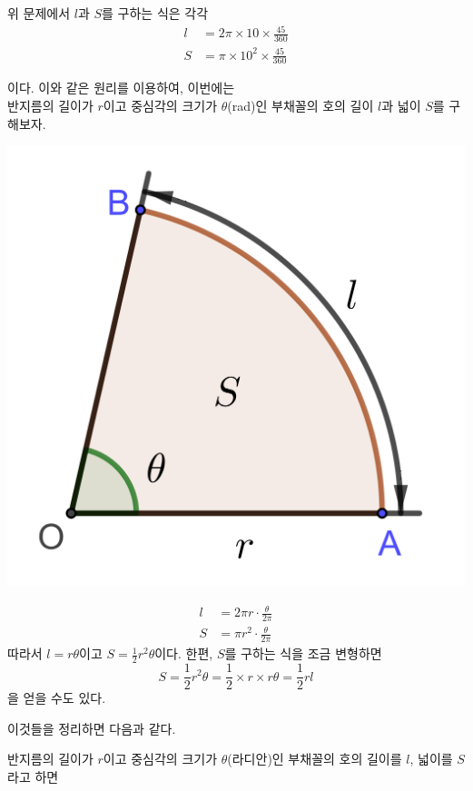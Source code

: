 \documentclass{oblivoir}
\begin{document}
%
\rema{}\label{arc2}
위 문제에서 \(l\)과 \(S\)를 구하는 식은 각각
\begin{align*}
l&=2\pi\times10\times\frac{45}{360}\\
S&=\pi\times10^2\times\frac{45}{360}
\end{align*}
\noindent
\begin{minipage}{.6\textwidth}
이다.
이와 같은 원리를 이용하여, 이번에는\\ 반지름의 길이가 \(r\)이고 중심각의 크기가 \(\theta\)(rad)인 부채꼴의 호의 길이 \(l\)과 넓이 \(S\)를 구해보자.\footnotemark
\end{minipage}
\begin{minipage}{.3\textwidth}
\centering
\includegraphics[width=.7\textwidth]{arc_2}
\end{minipage}
\begin{align*}
l&=2\pi r\cdot\frac{\theta}{2\pi}\\
S&=\pi r^2\cdot\frac{\theta}{2\pi}
\end{align*}
따라서 \(l=r\theta\)이고 \(S=\frac12r^2\theta\)이다.
한편, \(S\)를 구하는 식을 조금 변형하면
\[S=\frac12r^2\theta=\frac12\times r\times r\theta=\frac12rl
\]
을 얻을 수도 있다.

\newpage\noindent
이것들을 정리하면 다음과 같다.
\begin{mdframed}
%
\label{arc3}
반지름의 길이가 \(r\)이고 중심각의 크기가 \(\theta\)(라디안)인 부채꼴의 호의 길이를 \(l\), 넓이를 \(S\)라고 하면\\
\end{mdframed}
\end{document}
